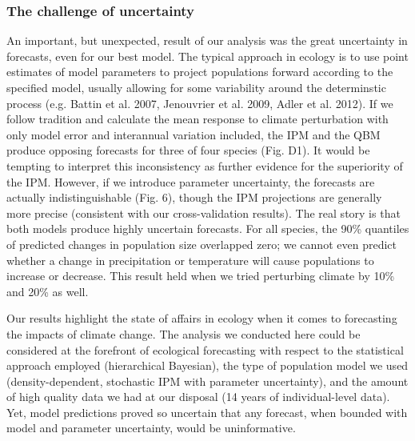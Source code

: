 \documentclass[12pt,]{article}
\begin{document}
\subsubsection{The challenge of
uncertainty}\label{the-challenge-of-uncertainty}

An important, but unexpected, result of our analysis was the great
uncertainty in forecasts, even for our best model. The typical approach
in ecology is to use point estimates of model parameters to project
populations forward according to the specified model, usually allowing
for some variability around the determinstic process (e.g. Battin et al.
2007, Jenouvrier et al. 2009, Adler et al. 2012). If we follow tradition
and calculate the mean response to climate perturbation with only model
error and interannual variation included, the IPM and the QBM produce
opposing forecasts for three of four species (Fig. D1). It would be
tempting to interpret this inconsistency as further evidence for the
superiority of the IPM. However, if we introduce parameter uncertainty,
the forecasts are actually indistinguishable (Fig. 6), though the IPM
projections are generally more precise (consistent with our
cross-validation results). The real story is that both models produce
highly uncertain forecasts. For all species, the 90\% quantiles of
predicted changes in population size overlapped zero; we cannot even
predict whether a change in precipitation or temperature will cause
populations to increase or decrease. This result held when we tried
perturbing climate by 10\% and 20\% as well.

Our results highlight the state of affairs in ecology when it comes to
forecasting the impacts of climate change. The analysis we conducted
here could be considered at the forefront of ecological forecasting with
respect to the statistical approach employed (hierarchical Bayesian),
the type of population model we used (density-dependent, stochastic IPM
with parameter uncertainty), and the amount of high quality data we had
at our disposal (14 years of individual-level data). Yet, model
predictions proved so uncertain that any forecast, when bounded with
model and parameter uncertainty, would be uninformative.
\end{document}
